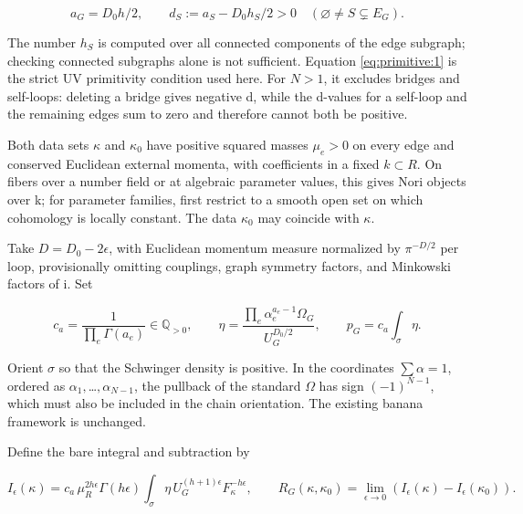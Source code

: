 \documentclass[11pt,a4paper,oneside]{article}
\theoremstyle{plain}
\theoremstyle{definition}
\theoremstyle{remark}
\numberwithin{equation}{section}
\begin{document}
\begin{equation}
a_G=D_0h/2,\qquad
 d_S:=a_S-D_0h_S/2>0\quad(\varnothing\ne S\subsetneq E_G).       \label{eq:primitive:1}
\end{equation}

The number \(h_S\) is computed over all connected components of the edge subgraph; checking connected subgraphs alone is not sufficient. Equation \eqref{eq:primitive:1} is the strict UV primitivity condition used here. For \(N>1\), it excludes bridges and self-loops: deleting a bridge gives negative d, while the d-values for a self-loop and the remaining edges sum to zero and therefore cannot both be positive.

Both data sets \(\kappa \) and \(\kappa _0\) have positive squared masses \(\mu _e>0\) on every edge and conserved Euclidean external momenta, with coefficients in a fixed \(k\subset R\). On fibers over a number field or at algebraic parameter values, this gives Nori objects over k; for parameter families, first restrict to a smooth open set on which cohomology is locally constant. The data \(\kappa _0\) may coincide with \(\kappa \).

Take \(D=D_0- 2\epsilon \), with Euclidean momentum measure normalized by \(\pi ^{- D/2}\) per loop, provisionally omitting couplings, graph symmetry factors, and Minkowski factors of i. Set

\begin{equation}
c_a=\frac1{\prod_e\Gamma(a_e)}\in\mathbb Q_{>0},\qquad
 \eta=\frac{\prod_e\alpha_e^{a_e-1}\Omega_G}{U_G^{D_0/2}},\qquad
 p_G=c_a\int_\sigma\eta.                                        \label{eq:primitive:2}
\end{equation}

Orient \(\sigma \) so that the Schwinger density is positive. In the coordinates \(\sum \alpha =1\), ordered as \(\alpha _1,\)\ldots{}\(,\alpha _{N- 1}\), the pullback of the standard \(\Omega \) has sign \((- 1)^{N- 1}\), which must also be included in the chain orientation. The existing banana framework is unchanged.

Define the bare integral and subtraction by

\begin{equation}
I_\epsilon(\kappa)=c_a\,\mu_R^{2h\epsilon}\Gamma(h\epsilon)
 \int_\sigma\eta\,U_G^{(h+1)\epsilon}F_\kappa^{-h\epsilon},\qquad
 R_G(\kappa,\kappa_0)=\lim_{\epsilon\to0}
                   (I_\epsilon(\kappa)-I_\epsilon(\kappa_0)).      \label{eq:primitive:3}
\end{equation}
\end{document}

